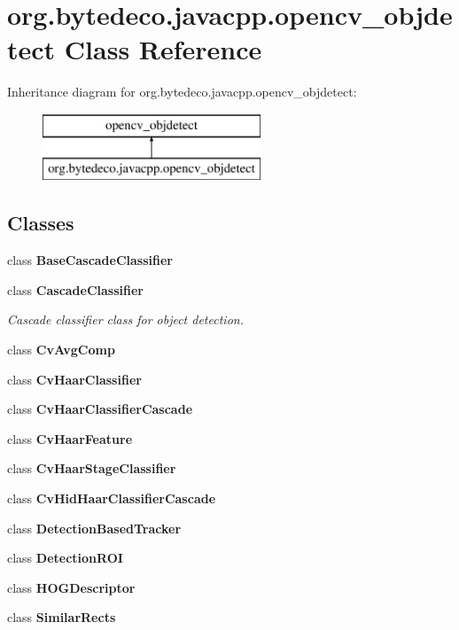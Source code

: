 \hypertarget{classorg_1_1bytedeco_1_1javacpp_1_1opencv__objdetect}{}\section{org.\+bytedeco.\+javacpp.\+opencv\+\_\+objdetect Class Reference}
\label{classorg_1_1bytedeco_1_1javacpp_1_1opencv__objdetect}
Inheritance diagram for org.\+bytedeco.\+javacpp.\+opencv\+\_\+objdetect\+:\begin{figure}[H]
\begin{center}
\leavevmode
\includegraphics[height=2.000000cm]{classorg_1_1bytedeco_1_1javacpp_1_1opencv__objdetect}
\end{center}
\end{figure}
\subsection*{Classes}
\begin{DoxyCompactItemize}
\item 
class {\bfseries Base\+Cascade\+Classifier}
\item 
class {\bfseries Cascade\+Classifier}
\begin{DoxyCompactList}\small\item\em Cascade classifier class for object detection. \end{DoxyCompactList}\item 
class {\bfseries Cv\+Avg\+Comp}
\item 
class {\bfseries Cv\+Haar\+Classifier}
\item 
class {\bfseries Cv\+Haar\+Classifier\+Cascade}
\item 
class {\bfseries Cv\+Haar\+Feature}
\item 
class {\bfseries Cv\+Haar\+Stage\+Classifier}
\item 
class {\bfseries Cv\+Hid\+Haar\+Classifier\+Cascade}
\item 
class {\bfseries Detection\+Based\+Tracker}
\item 
class {\bfseries Detection\+R\+OI}
\item 
class {\bfseries H\+O\+G\+Descriptor}
\item 
class {\bfseries Similar\+Rects}
\end{DoxyCompactItemize}
